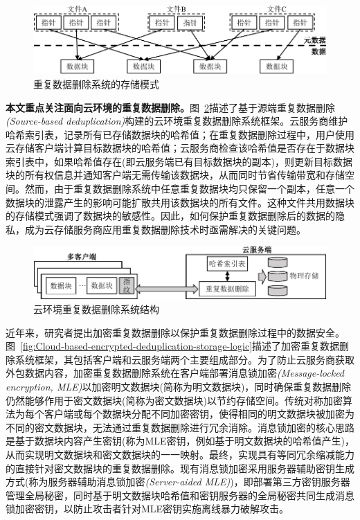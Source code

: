 \begin{figure}[!htb]
    \small
    \centering
    \includegraphics[width=\textwidth]{pic/background/dedupOverview.pdf}
    \caption{重复数据删除系统的存储模式}
    \label{fig:Deduplication-storage-pattern}
\end{figure}

\textbf{本文重点关注面向云环境的重复数据删除。}图~\ref{fig:Cloud-based-deduplication-storage-logic}描述了基于源端重复数据删除\textit{(Source-based deduplication)}构建的云环境重复数据删除系统框架。云服务商维护哈希索引表，记录所有已存储数据块的哈希值；在重复数据删除过程中，用户使用云存储客户端计算目标数据块的哈希值；云服务商检查该哈希值是否存在于数据块索引表中，如果哈希值存在(即云服务端已有目标数据块的副本)，则更新目标数据块的所有权信息并通知客户端无需传输该数据块，从而同时节省传输带宽和存储空间。然而，由于重复数据删除系统中任意重复数据块均只保留一个副本，任意一个数据块的泄露产生的影响可能扩散共用该数据块的所有文件。这种文件共用数据块的存储模式强调了数据块的敏感性。因此，如何保护重复数据删除后的数据的隐私，成为云存储服务商应用重复数据删除技术时亟需解决的关键问题。

\begin{figure}[!htb]
    \small
    \centering
    \includegraphics[width=\textwidth]{pic/background/Cloud-deduplication.pdf}
    \caption{云环境重复数据删除系统结构}
    \label{fig:Cloud-based-deduplication-storage-logic}
\end{figure}
近年来，研究者提出加密重复数据删除以保护重复数据删除过程中的数据安全。图~\ref{fig:Cloud-based-encrypted-deduplication-storage-logic}描述了加密重复数据删除系统框架，其包括客户端和云服务端两个主要组成部分。为了防止云服务商获取外包数据内容，加密重复数据删除系统在客户端部署消息锁加密\textit{(Message-locked encryption, MLE)}以加密明文数据块(简称为明文数据块)，同时确保重复数据删除仍然能够作用于密文数据块(简称为密文数据块)以节约存储空间。传统对称加密算法为每个客户端或每个数据块分配不同加密密钥，使得相同的明文数据块被加密为不同的密文数据块，无法通过重复数据删除进行冗余消除。消息锁加密的核心思路是基于数据块内容产生密钥(称为MLE密钥，例如基于明文数据块的哈希值产生)，从而实现明文数据块和密文数据块的一一映射。最终，实现具有等同冗余缩减能力的直接针对密文数据块的重复数据删除。现有消息锁加密采用服务器辅助密钥生成方式(称为服务器辅助消息锁加密\textit{(Server-aided MLE)})，即部署第三方密钥服务器管理全局秘密，同时基于明文数据块哈希值和密钥服务器的全局秘密共同生成消息锁加密密钥，以防止攻击者针对MLE密钥实施离线暴力破解攻击。

